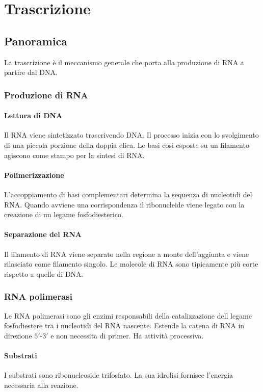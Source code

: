 \chapter{Trascrizione}

\section{Panoramica}
La trascrizione \`e il meccanismo generale che porta alla produzione di RNA a partire dal DNA.

	\subsection{Produzione di RNA}

		\subsubsection{Lettura di DNA}
		Il RNA viene sintetizzato trascrivendo DNA.
		Il processo inizia con lo svolgimento di una piccola porzione della doppia elica.
		Le basi cos\`i esposte su un filamento agiscono come stampo per la sintesi di RNA.
		
		\subsubsection{Polimerizzazione}
		L'accoppiamento di basi complementari determina la sequenza di nucleotidi del RNA.
		Quando avviene una corrispondenza il ribonucleide viene legato con la creazione di un legame fosfodiesterico.

		\subsubsection{Separazione del RNA}
		Il filamento di RNA viene separato nella regione a monte dell'aggiunta e viene rilasciato come filamento singolo.
		Le molecole di RNA sono tipicamente pi\`u corte rispetto a quelle di DNA.

	\subsection{RNA polimerasi}
	Le RNA polimerasi sono gli enzimi responsabili della catalizzazione dell legame fosfodiestere tra i nucleotidi del RNA nascente.
	Estende la catena di RNA in direzione $5'$-$3'$ e non necessita di primer.
	Ha attivit\`a processiva.

		\subsubsection{Substrati}
		I substrati sono ribonucleoside trifosfato.
		La sua idrolisi fornisce l'energia necessaria alla reazione.

